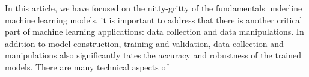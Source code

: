In this article, we have focused on the nitty-gritty of the fundamentals underline machine learning models, it is important to address that there is another critical part of machine learning applications: data collection and data manipulations. In addition to model construction, training and validation, data collection and manipulations also significantly tates the accuracy and robustness of the trained models. There are many technical aspects of 
